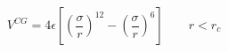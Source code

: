 \pagestyle{empty}



$$
 V^{CG} = 4 \epsilon \left[ \left(\frac{\sigma}{r}\right)^{12} - 
                       \left(\frac{\sigma}{r}\right)^6 \right]
                       \qquad r < r_c
$$


